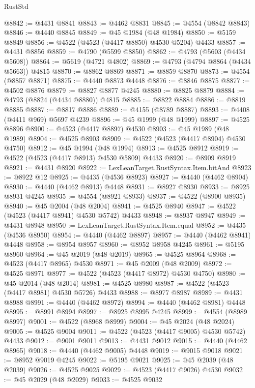 \begin{lexlean}{RustStd}
\begin{coremodule}
@8842 := @4431 @8841
@8843 := @4462 @8831
@8845 := @4554 (@8842 @8843)
@8846 := @4440 @8845
@8849 := @45 @1984 (@48 @1984)
@8850 := @5159 @8849
@8856 := @4522 (@4523 (@4417 @8850) @4530 @5204) @4433
@8857 := @4431 @8856
@8859 := @4790 (@5599 @8850)
@8862 := @4793 (@5603 (@4434 @5608))
@8864 := @5619 (@4721 @4802)
@8869 := @4793 (@4794 @8864 (@4434 @5663)) @4815
@8870 := @8862 @8869
@8871 := @8859 @8870
@8873 := @4554 (@8857 @8871)
@8875 := @4440 @8873 @4448
@8876 := @8846 @8875
@8877 := @4502 @8876
@8879 := @8827 @8877 @4245
@8880 := @8825 @8879
@8884 := @4793 (@8824 (@4434 @8880)) @4815
@8885 := @8822 @8884
@8886 := @8819 @8885
@8887 := @8817 @8886
@8889 := @4155 (@8789 @8887)
@8893 := @4408 (@4411 @969) @5697 @4239
@8896 := @45 @1999 (@48 @1999)
@8897 := @4525 @8896
@8900 := @4523 (@4417 @8897) @4530
@8903 := @45 @1989 (@48 @1989)
@8904 := @4525 @8903
@8909 := @4522 (@4523 (@4417 @8904) @4530 @4750)
@8912 := @45 @1994 (@48 @1994)
@8913 := @4525 @8912
@8919 := @4522 (@4523 (@4417 @8913) @4530 @5809) @4433
@8920 := @8909 @8919
@8921 := @4431 @8920
@8922 := LexLeanTarget.RustSyntax.Item.bitAnd
@8923 := @8922 @12
@8925 := @4435 (@4536 @8923)
@8927 := @4440 (@4462 @8904)
@8930 := @4440 (@4462 @8913) @4448
@8931 := @8927 @8930
@8933 := @8925 @8931 @4245
@8935 := @4554 (@8921 @8933)
@8937 := @4522 (@8900 @8935)
@8940 := @45 @2004 (@48 @2004)
@8941 := @4525 @8940
@8947 := @4522 (@4523 (@4417 @8941) @4530 @5742) @4433
@8948 := @8937 @8947
@8949 := @4431 @8948
@8950 := LexLeanTarget.RustSyntax.Item.equal
@8952 := @4435 (@4536 @8950)
@8954 := @4440 (@4462 @8897)
@8957 := @4440 (@4462 @8941) @4448
@8958 := @8954 @8957
@8960 := @8952 @8958 @4245
@8961 := @5195 @8960
@8964 := @45 @2019 (@48 @2019)
@8965 := @4525 @8964
@8968 := @4523 (@4417 @8965) @4530
@8971 := @45 @2009 (@48 @2009)
@8972 := @4525 @8971
@8977 := @4522 (@4523 (@4417 @8972) @4530 @4750)
@8980 := @45 @2014 (@48 @2014)
@8981 := @4525 @8980
@8987 := @4522 (@4523 (@4417 @8981) @4530 @5726) @4433
@8988 := @8977 @8987
@8989 := @4431 @8988
@8991 := @4440 (@4462 @8972)
@8994 := @4440 (@4462 @8981) @4448
@8995 := @8991 @8994
@8997 := @8925 @8995 @4245
@8999 := @4554 (@8989 @8997)
@9001 := @4522 (@8968 @8999)
@9004 := @45 @2024 (@48 @2024)
@9005 := @4525 @9004
@9011 := @4522 (@4523 (@4417 @9005) @4530 @5742) @4433
@9012 := @9001 @9011
@9013 := @4431 @9012
@9015 := @4440 (@4462 @8965)
@9018 := @4440 (@4462 @9005) @4448
@9019 := @9015 @9018
@9021 := @8952 @9019 @4245
@9022 := @5195 @9021
@9025 := @45 @2039 (@48 @2039)
@9026 := @4525 @9025
@9029 := @4523 (@4417 @9026) @4530
@9032 := @45 @2029 (@48 @2029)
@9033 := @4525 @9032

\end{coremodule}
\end{lexlean}
